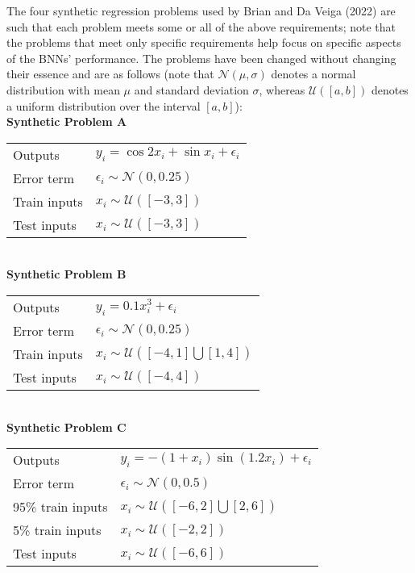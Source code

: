 \documentclass[conference]{IEEEtran}
\begin{document}
The four synthetic regression problems used by Brian and Da Veiga (2022) are such that each problem meets some or all of the above requirements; note that the problems that meet only specific requirements help focus on specific aspects of the BNNs' performance. The problems have been changed without changing their essence and are as follows (note that $\mathcal{N}(\mu, \sigma)$ denotes a normal distribution with mean $\mu$ and standard deviation $\sigma$, whereas $\mathcal{U}([a, b])$ denotes a uniform distribution over the interval $[a, b]$):\\

\textbf{Synthetic Problem A}

\begin{tabular}{m{2.5cm} | m{6cm}}
    Outputs & $y_i = \cos{2x_i} + \sin{x_i} + \epsilon_i$ \\
    Error term & $\epsilon_i \sim \mathcal{N}(0, 0.25)$ \\
    Train inputs & $x_i \sim \mathcal{U}([-3, 3])$ \\
    Test inputs & $x_i \sim \mathcal{U}([-3, 3])$
\end{tabular} \\

\textbf{Synthetic Problem B}

\begin{tabular}{m{2.5cm} | m{6cm}}
    Outputs & $y_i = 0.1x_i^3 + \epsilon_i$ \\
    Error term & $\epsilon_i \sim \mathcal{N}(0, 0.25)$ \\
    Train inputs & $x_i \sim \mathcal{U}([-4, 1] \bigcup [1, 4])$ \\
    Test inputs & $x_i \sim \mathcal{U}([-4, 4])$
\end{tabular} \\

\textbf{Synthetic Problem C}

\begin{tabular}{m{2.5cm} | m{6cm}}
    Outputs & $y_i = -(1 + x_i)\sin(1.2x_i) + \epsilon_i$ \\
    Error term & $\epsilon_i \sim \mathcal{N}(0, 0.5)$ \\
    95\% train inputs & $x_i \sim \mathcal{U}([-6, 2] \bigcup [2, 6])$ \\
    5\% train inputs & $x_i \sim \mathcal{U}([-2, 2])$ \\
    Test inputs & $x_i \sim \mathcal{U}([-6, 6])$
\end{tabular} \\
\end{document}
